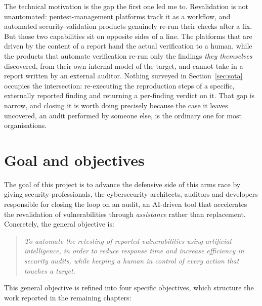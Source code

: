 The technical motivation is the gap the first one led me to. Revalidation is not
unautomated: pentest-management platforms track it as a workflow, and automated
security-validation products genuinely re-run their checks after a fix. But those two
capabilities sit on opposite sides of a line. The platforms that are driven by the
content of a report hand the actual verification to a human, while the products that
automate verification re-run only the findings \emph{they themselves} discovered, from
their own internal model of the target, and cannot take in a report written by an
external auditor. Nothing surveyed in Section~\ref{sec:sota} occupies the intersection:
re-executing the reproduction steps of a specific, externally reported finding and
returning a per-finding verdict on it. That gap is narrow, and closing it is worth
doing precisely because the case it leaves uncovered, an audit performed by someone
else, is the ordinary one for most organisations.

\section{Goal and objectives}
\label{sec:objectives}

The goal of this project is to advance the defensive side of this arms race by
giving security professionals, the cybersecurity architects, auditors and
developers responsible for closing the loop on an audit, an AI-driven tool that
accelerates the revalidation of vulnerabilities through \emph{assistance} rather
than replacement. Concretely, the general objective is:

\begin{quote}
\emph{To automate the retesting of reported vulnerabilities using artificial
intelligence, in order to reduce response time and increase efficiency in security
audits, while keeping a human in control of every action that touches a target.}
\end{quote}

This general objective is refined into four specific objectives, which structure the
work reported in the remaining chapters:

